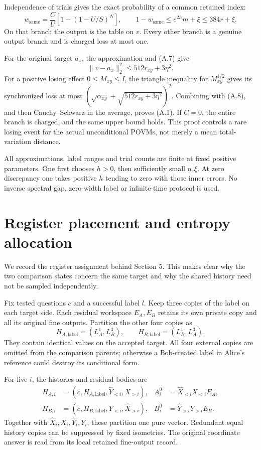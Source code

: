 \documentclass[11pt,reqno]{amsart}
\numberwithin{equation}{section}
\begin{document}
Independence of trials gives the exact probability of a common retained index: \[
 w_{\mathrm{same}}=\frac C U[1-(1-U/S)^N],\qquad
 1-w_{\mathrm{same}}\le e^{2h}m+\xi\le384r+\xi. \tag{A.8}
\] On that branch the output is the table on \(v\). Every other branch is a genuine output branch and is charged loss at most one.

For the original target \(a_x\), the approximation and (A.7) give \[
 \|v-a_x\|_2^2\le512r_{xy}+3\eta^2 .
\] For a positive losing effect \(0\le M_{xy}\le I\), the triangle inequality for \(M_{xy}^{1/2}\) gives its synchronized loss at most \((\sqrt{\alpha_{xy}}+\sqrt{512r_{xy}+3\eta^2})^2\). Combining with (A.8), and then Cauchy--Schwarz in the average, proves (A.1). If \(C=0\), the entire branch is charged, and the same upper bound holds. This proof controls a rare losing event for the actual unconditional POVMs, not merely a mean total-variation distance.

All approximations, label ranges and trial counts are finite at fixed positive parameters. One first chooses \(h>0\), then sufficiently small \(\eta,\xi\). At zero discrepancy one takes positive \(h\) tending to zero with those inner errors. No inverse spectral gap, zero-width label or infinite-time protocol is used.

\section{Register placement and entropy allocation}\label{register-placement-and-entropy-allocation}

We record the register assignment behind Section 5. This makes clear why the two comparison states concern the same target and why the shared history need not be sampled independently.

Fix tested questions \(c\) and a successful label \(l\). Keep three copies of the label on each target side. Each residual workspace \(E_A,E_B\) retains its own private copy and all its original fine outputs. Partition the other four copies as \[
 H_{A,\mathrm{label}}=(L_A^1,L_B^3),\qquad
 H_{B,\mathrm{label}}=(L_B^1,L_A^3).
\] They contain identical values on the accepted target. All four external copies are omitted from the comparison parents; otherwise a Bob-created label in Alice's reference could destroy its conditional form.

For live \(i\), the histories and residual bodies are \[
\begin{aligned}
 H_{A,i}&=(c,H_{A,\mathrm{label}},\widehat Y_{<i},X_{>i}),&
 A_i^0&=\widehat X_{<i}X_{<i}E_A,\\
 H_{B,i}&=(c,H_{B,\mathrm{label}},Y_{<i},\widehat X_{>i}),&
 B_i^0&=\widehat Y_{>i}Y_{>i}E_B .
\end{aligned}
\] Together with \(\widehat X_i,X_i,\widehat Y_i,Y_i\), these partition one pure vector. Redundant equal history copies can be suppressed by fixed isometries. The original coordinate answer is read from its local retained fine-output record.
\end{document}
